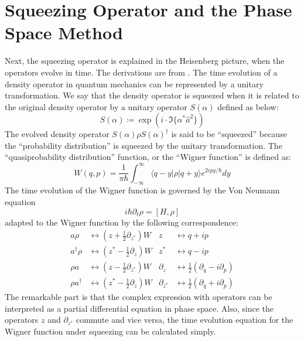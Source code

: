 \documentclass[10pt,a4paper]{report}
\newcommand*\bra[1]{\langle{#1}|}
\newcommand*\ket[1]{|{#1}\rangle}
\begin{document}
\section{Squeezing Operator and the Phase Space Method}
Next, the squeezing operator is explained in the Heisenberg picture, when the operators evolve in time. The derivations are from \cite{qnoise}.
The time evolution of a density operator in quantum mechanics can be represented by a unitary transformation.
We say that the density operator is squeezed when it is related to the original density operator by a unitary operator $S(\alpha)$ defined as below:
\begin{equation}
  S(\alpha)\coloneq\exp(i\cdot\Im\{\alpha^{*} \hat{a}^{2}\})
\end{equation}
The evolved density operator $S(\alpha)\rho S(\alpha)^{\dag}$ is said to be ``squeezed'' because the ``probability distribution'' is squeezed by the unitary transformation.
The ``quasiprobability distribution'' function, or the ``Wigner function'' is defined as:
\begin{equation}
  W(q,p)=\frac{1}{\pi\hbar}\int_{-\infty}^{\infty}\bra{q-y}\rho\ket{q+y}e^{2ipy/\hbar}dy
\end{equation}
The time evolution of the Wigner function is governed by the Von Neumann equation
\begin{equation}
  i\hbar\partial_{t}\rho=[H,\rho]
\end{equation}
adapted to the Wigner function by the following correspondence:
\begin{align}
  a\rho         & \leftrightarrow \left(z+\frac{1}{2}\partial_{z^{*}}\right)W & z                & \leftrightarrow q+ip                                    \\
  a^{\dag}\rho  & \leftrightarrow \left(z^{*}-\frac{1}{2}\partial_{z}\right)W & z^{*}            & \leftrightarrow q-ip                                    \\
  \rho a        & \leftrightarrow \left(z-\frac{1}{2}\partial_{z^{*}}\right)W & \partial_{z}     & \leftrightarrow \frac{1}{2}(\partial_{q}-i\partial_{p}) \\
  \rho a^{\dag} & \leftrightarrow \left(z^{*}-\frac{1}{2}\partial_{z}\right)W & \partial_{z^{*}} & \leftrightarrow \frac{1}{2}(\partial_{q}+i\partial_{p})
\end{align}
The remarkable part is that the complex expression with operators can be interpreted as a partial differential equation in phase space.
Also, since the operators $z$ and $\partial_{z^{*}}$ commute and vice versa, the time evolution equation for the Wigner function under squeezing can be calculated simply.
\end{document}
